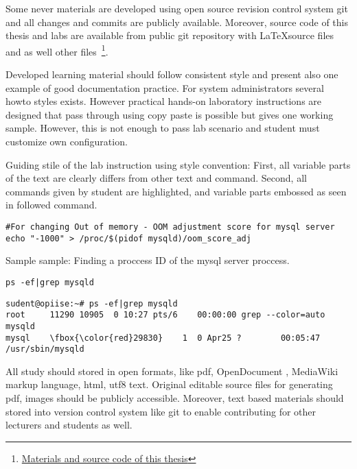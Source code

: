 Some never materials are developed using open source revision control system \gls{git} and all changes and commits are publicly available. Moreover, source code of this thesis and labs are available from public \gls{git} repository with \LaTeX  source files and as well other files~\footnote{\href{https://github.com/magavdraakon/margus-thesis.git}{Materials and source code of this thesis}}.


Developed learning material should follow consistent style and present also one example of good documentation practice. For system administrators several howto styles exists. However practical hands-on laboratory instructions are designed that pass through using copy paste is possible but gives one working sample. However, this is not enough to pass lab scenario and student must customize own configuration.

Guiding stile of the lab instruction using style convention: First, all variable parts of the text are clearly differs from other text and command. Second, all commands given by student are highlighted, and variable parts embossed as seen in followed command.


\begin{verbatim}
#For changing Out of memory - OOM adjustment score for mysql server
echo "-1000" > /proc/$(pidof mysqld)/oom_score_adj
\end{verbatim}



Sample sample: Finding a proccess ID of the mysql server proccess.

\begin{verbatim}
ps -ef|grep mysqld
\end{verbatim}
\label{code_sample}
%
\small{
\begin{Verbatim}[frame=single,
label=Command output,framesep=2mm,rulecolor=\color{red},commandchars=\\\{\}]
sudent@opiise:~# ps -ef|grep mysqld
root     11290 10905  0 10:27 pts/6    00:00:00 grep --color=auto mysqld
mysql    \fbox{\color{red}29830}    1  0 Apr25 ?        00:05:47 /usr/sbin/mysqld
\end{Verbatim}
%
}

All study should stored in open formats, like pdf, OpenDocument , MediaWiki markup language, html, utf8 text. Original editable source files for generating pdf, images should be publicly accessible. Moreover, text based materials should stored into version control system like \gls{git} to enable contributing for other lecturers and students as well.



